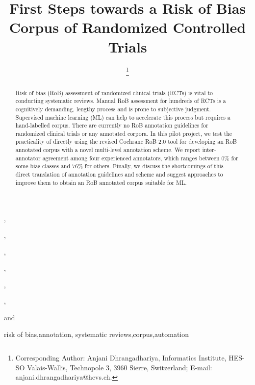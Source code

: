 \documentclass{IOS-Book-Article}
\def\hb{\hbox to 11.5 cm{}}
\begin{document}
\pagestyle{headings}
\def\thepage{}
\begin{frontmatter}              %


\title{First Steps towards a Risk of Bias Corpus of Randomized Controlled Trials}

\markboth{}{April 2022\hb}

\author[A,B]{ %
\thanks{Corresponding Author: Anjani Dhrangadhariya, Informatics Institute, HES-SO Valais-Wallis, Technopole 3,
3960 Sierre, Switzerland; E-mail:
anjani.dhrangadhariya@hevs.ch.}},
\author[C,D]{ }
,
\author[C,D]{ }
,
\author[C,D]{ }
,
\author[C,D]{ }
,
\author[C,D]{ }
,
\author[E,F]{ }
and
\author[A,B]{ }

\address[A]{Informatics Institute, HES-SO Valais-Wallis, Sierre, Switzerland}
\address[B]{University of Geneva (UNIGE), Geneva, Switzerland}
\address[C]{School of Health Sciences, HES-SO Valais-Wallis, Leukerbad, Switzerland.}
\address[D]{Department of Physiotherapy, HES-SO Valais-Wallis, Leukerbad, Switzerland.}
\address[E]{Geneva School of Business Administration, HES-SO Geneva, Switzerland.}
\address[F]{SIB Swiss Institute of Bioinformatics (SIB), Geneva, Switzerland}

\begin{abstract}
Risk of bias (RoB) assessment of randomized clinical trials (RCTs) is vital to conducting systematic reviews. 
Manual RoB assessment for hundreds of RCTs is a cognitively demanding, lengthy process and is prone to subjective judgment. 
Supervised machine learning (ML) can help to accelerate this process but requires a hand-labelled corpus.
There are currently no RoB annotation guidelines for randomized clinical trials or any annotated corpora.
In this pilot project, we test the practicality of directly using the revised Cochrane RoB 2.0 tool for developing an RoB annotated corpus with a novel multi-level annotation scheme.
We report inter-annotator agreement among four experienced annotators, which ranges between 0\% for some bias classes and 76\% for others.
Finally, we discuss the shortcomings of this direct translation of annotation guidelines and scheme and suggest approaches to improve them to obtain an RoB annotated corpus suitable for ML.
\end{abstract}

\begin{keyword}
risk of bias\sep annotation\sep
systematic reviews\sep corpus\sep automation
\end{keyword}
\end{frontmatter}
\markboth{April 2022\hb}{April 2022\hb}
%
%
%
\end{document}
